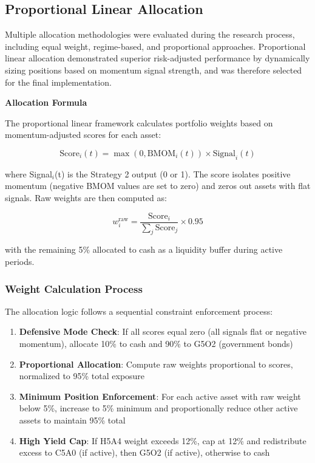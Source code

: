 \documentclass[11pt, letterpaper]{article}
\begin{document}
\subsection{Proportional Linear Allocation}

Multiple allocation methodologies were evaluated during the research process, including equal weight, regime-based, and proportional approaches. Proportional linear allocation demonstrated superior risk-adjusted performance by dynamically sizing positions based on momentum signal strength, and was therefore selected for the final implementation.

\textbf{Allocation Formula}

The proportional linear framework calculates portfolio weights based on momentum-adjusted scores for each asset:

\begin{equation}
\text{Score}_i(t) = \max(0, \text{BMOM}_i(t)) \times \text{Signal}_i(t)
\end{equation}

where Signal$_i$(t) is the Strategy 2 output (0 or 1). The score isolates positive momentum (negative BMOM values are set to zero) and zeros out assets with flat signals. Raw weights are then computed as:

\begin{equation}
w_i^{\text{raw}} = \frac{\text{Score}_i}{\sum_j \text{Score}_j} \times 0.95
\end{equation}

with the remaining 5\% allocated to cash as a liquidity buffer during active periods.

\subsubsection{Weight Calculation Process}

The allocation logic follows a sequential constraint enforcement process:

\begin{enumerate}
    \item \textbf{Defensive Mode Check}: If all scores equal zero (all signals flat or negative momentum), allocate 10\% to cash and 90\% to G5O2 (government bonds)

    \item \textbf{Proportional Allocation}: Compute raw weights proportional to scores, normalized to 95\% total exposure

    \item \textbf{Minimum Position Enforcement}: For each active asset with raw weight below 5\%, increase to 5\% minimum and proportionally reduce other active assets to maintain 95\% total

    \item \textbf{High Yield Cap}: If H5A4 weight exceeds 12\%, cap at 12\% and redistribute excess to C5A0 (if active), then G5O2 (if active), otherwise to cash
\end{enumerate}
\end{document}

